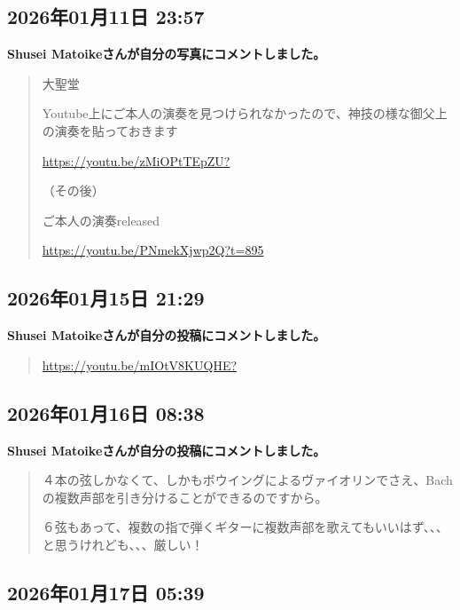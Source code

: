 \subsection*{2026年01月11日 23:57}

\textbf{Shusei Matoikeさんが自分の写真にコメントしました。}

\begin{quote}
大聖堂

Youtube上にご本人の演奏を見つけられなかったので、神技の様な御父上の演奏を貼っておきます

\url{https://youtu.be/zMiOPtTEpZU?}

（その後）

ご本人の演奏released

\url{https://youtu.be/PNmekXjwp2Q?t=895}
\end{quote}

\subsection*{2026年01月15日 21:29}

\textbf{Shusei Matoikeさんが自分の投稿にコメントしました。}

\begin{quote}
\url{https://youtu.be/mIOtV8KUQHE?}
\end{quote}

\subsection*{2026年01月16日 08:38}

\textbf{Shusei Matoikeさんが自分の投稿にコメントしました。}

\begin{quote}
４本の弦しかなくて、しかもボウイングによるヴァイオリンでさえ、Bachの複数声部を引き分けることができるのですから。

６弦もあって、複数の指で弾くギターに複数声部を歌えてもいいはず、、、と思うけれども、、、厳しい！
\end{quote}

\subsection*{2026年01月17日 05:39}

